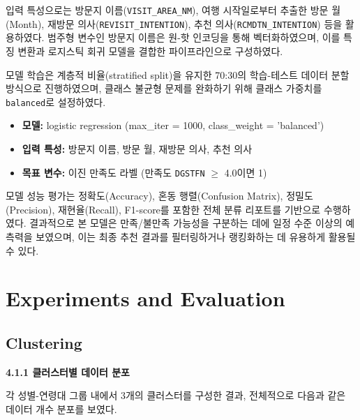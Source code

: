 \documentclass[sigconf]{acmart}
\begin{document}
\begin{CJK}{UTF8}{mj}
입력 특성으로는 방문지 이름(\texttt{VISIT\_AREA\_NM}), 여행 시작일로부터 추출한 방문 월(Month), 재방문 의사(\texttt{REVISIT\_INTENTION}), 추천 의사(\texttt{RCMDTN\_INTENTION}) 등을 활용하였다. 범주형 변수인 방문지 이름은 원-핫 인코딩을 통해 벡터화하였으며, 이를 특징 변환과 로지스틱 회귀 모델을 결합한 파이프라인으로 구성하였다.

모델 학습은 계층적 비율(stratified split)을 유지한 70:30의 학습-테스트 데이터 분할 방식으로 진행하였으며, 클래스 불균형 문제를 완화하기 위해 클래스 가중치를 \texttt{balanced}로 설정하였다.

\begin{itemize}
  \item \textbf{모델:} logistic regression (max\_iter = 1000, class\_weight = 'balanced')
  \item \textbf{입력 특성:} 방문지 이름, 방문 월, 재방문 의사, 추천 의사
  \item \textbf{목표 변수:} 이진 만족도 라벨 (만족도 \texttt{DGSTFN} $\geq$ 4.0이면 1)
\end{itemize}

모델 성능 평가는 정확도(Accuracy), 혼동 행렬(Confusion Matrix), 정밀도(Precision), 재현율(Recall), F1-score를 포함한 전체 분류 리포트를 기반으로 수행하였다. 결과적으로 본 모델은 만족/불만족 가능성을 구분하는 데에 일정 수준 이상의 예측력을 보였으며, 이는 최종 추천 결과를 필터링하거나 랭킹화하는 데 유용하게 활용될 수 있다.



\section{Experiments and Evaluation}%

\subsection{Clustering}

\noindent\textbf{4.1.1 클러스터별 데이터 분포}\par

각 성별-연령대 그룹 내에서 3개의 클러스터를 구성한 결과, 전체적으로 다음과 같은 데이터 개수 분포를 보였다.


\end{CJK}
\end{document}
